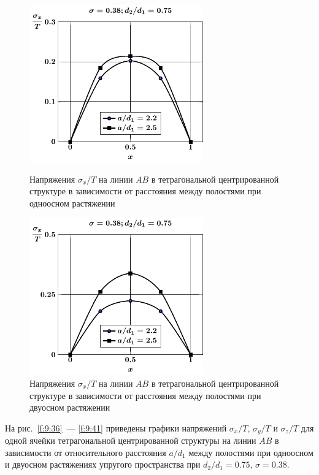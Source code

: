 \begin{figure}[h!]
\centering\footnotesize
\parbox[b]{7.5cm}{\centering\includegraphics[width=7.5cm]{cav9-a-d75-t1-sig_x.pdf}
\caption{Напряжения $\sigma_x/T$ на линии $AB$ в тетрагональной центрированной структуре в зависимости от расстояния между полостями при одноосном растяжении 
\label{f:9:36}}}\hfil\hfil
\parbox[b]{7.5cm}{\centering\includegraphics[width=7.5cm]{cav9-a-d75-t2-sig_x.pdf}
\caption{Напряжения $\sigma_x/T$ на линии $AB$ в тетрагональной центрированной структуре в зависимости от расстояния между полостями при двуосном растяжении
\label{f:9:37}}}
\end{figure}

На рис.~\ref{f:9:36}~--- \ref{f:9:41} приведены графики напряжений $\sigma_x/T$, $\sigma_y/T$ и $\sigma_z/T$ для одной ячейки тетрагональной центрированной структуры на линии $AB$ в зависимости от относительного расстояния $a/d_1$ между полостями при одноосном и двуосном растяжениях упругого пространства при $d_2/d_1=0.75$, $\sigma=0.38$.

